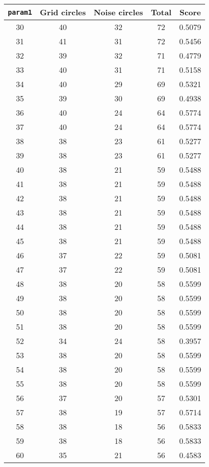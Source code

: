 \documentclass[letterpaper, 12pt]{article}
\begin{document}
\begin{longtable}{|c|c|c|c|c|}
\hline
\textbf{\texttt{param1}} & \textbf{Grid circles} & \textbf{Noise circles} & \textbf{Total} & \textbf{Score} \\
\hline
30 & 40 & 32 & 72 & 0.5079 \\
\hline
31 & 41 & 31 & 72 & 0.5456 \\
\hline
32 & 39 & 32 & 71 & 0.4779 \\
\hline
33 & 40 & 31 & 71 & 0.5158 \\
\hline
34 & 40 & 29 & 69 & 0.5321 \\
\hline
35 & 39 & 30 & 69 & 0.4938 \\
\hline
36 & 40 & 24 & 64 & 0.5774 \\
\hline
37 & 40 & 24 & 64 & 0.5774 \\
\hline
38 & 38 & 23 & 61 & 0.5277 \\
\hline
39 & 38 & 23 & 61 & 0.5277 \\
\hline
40 & 38 & 21 & 59 & 0.5488 \\
\hline
41 & 38 & 21 & 59 & 0.5488 \\
\hline
42 & 38 & 21 & 59 & 0.5488 \\
\hline
43 & 38 & 21 & 59 & 0.5488 \\
\hline
44 & 38 & 21 & 59 & 0.5488 \\
\hline
45 & 38 & 21 & 59 & 0.5488 \\
\hline
46 & 37 & 22 & 59 & 0.5081 \\
\hline
47 & 37 & 22 & 59 & 0.5081 \\
\hline
48 & 38 & 20 & 58 & 0.5599 \\
\hline
49 & 38 & 20 & 58 & 0.5599 \\
\hline
50 & 38 & 20 & 58 & 0.5599 \\
\hline
51 & 38 & 20 & 58 & 0.5599 \\
\hline
52 & 34 & 24 & 58 & 0.3957 \\
\hline
53 & 38 & 20 & 58 & 0.5599 \\
\hline
54 & 38 & 20 & 58 & 0.5599 \\
\hline
55 & 38 & 20 & 58 & 0.5599 \\
\hline
56 & 37 & 20 & 57 & 0.5301 \\
\hline
57 & 38 & 19 & 57 & 0.5714 \\
\hline
58 & 38 & 18 & 56 & 0.5833 \\
\hline
59 & 38 & 18 & 56 & 0.5833 \\
\hline
60 & 35 & 21 & 56 & 0.4583 \\

\end{longtable}
\end{document}
